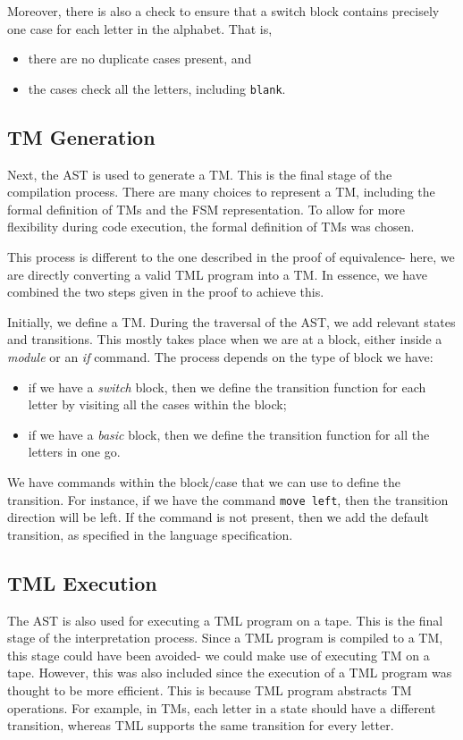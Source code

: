 Moreover, there is also a check to ensure that a switch block contains precisely one case for each letter in the alphabet. That is,
\begin{itemize}
    \item there are no duplicate cases present, and 
    \item the cases check all the letters, including \texttt{blank}.
\end{itemize}

\subsection{TM Generation}
Next, the AST is used to generate a TM. This is the final stage of the compilation process. There are many choices to represent a TM, including the formal definition of TMs and the FSM representation. To allow for more flexibility during code execution, the formal definition of TMs was chosen. 

This process is different to the one described in the proof of equivalence- here, we are directly converting a valid TML program into a TM. In essence, we have combined the two steps given in the proof to achieve this.

Initially, we define a TM. During the traversal of the AST, we add relevant states and transitions. This mostly takes place when we are at a block, either inside a \textit{module} or an \textit{if} command. The process depends on the type of block we have:
\begin{itemize}
    \item if we have a \textit{switch} block, then we define the transition function for each letter by visiting all the cases within the block;
    \item if we have a \textit{basic} block, then we define the transition function for all the letters in one go.
\end{itemize}
We have commands within the block/case that we can use to define the transition. For instance, if we have the command \texttt{move left}, then the transition direction will be left. If the command is not present, then we add the default transition, as specified in the language specification.

\subsection{TML Execution}

The AST is also used for executing a TML program on a tape. This is the final stage of the interpretation process. Since a TML program is compiled to a TM, this stage could have been avoided- we could make use of executing TM on a tape. However, this was also included since the execution of a TML program was thought to be more efficient. This is because TML program abstracts TM operations. For example, in TMs, each letter in a state should have a different transition, whereas TML supports the same transition for every letter.

